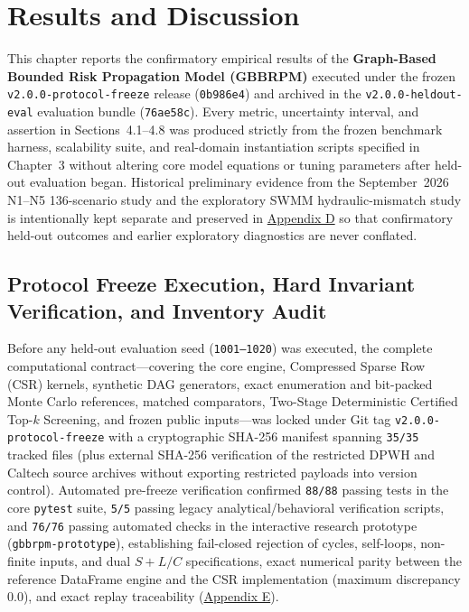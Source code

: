 \section{Results and Discussion}\label{results-and-discussion}

This chapter reports the confirmatory empirical results of the
\textbf{Graph-Based Bounded Risk Propagation Model (GBBRPM)} executed
under the frozen \texttt{v2.0.0-protocol-freeze} release
(\texttt{0b986e4}) and archived in the \texttt{v2.0.0-heldout-eval}
evaluation bundle (\texttt{76ae58c}). Every metric, uncertainty
interval, and assertion in Sections~4.1--4.8 was produced strictly from
the frozen benchmark harness, scalability suite, and real-domain
instantiation scripts specified in Chapter~3 without altering core
model equations or tuning parameters after held-out evaluation began.
Historical preliminary evidence from the September~2026 N1--N5
136-scenario study and the exploratory SWMM hydraulic-mismatch study is
intentionally kept separate and preserved in
\hyperref[app:preliminary]{Appendix D} so that confirmatory held-out
outcomes and earlier exploratory diagnostics are never conflated.

\subsection{Protocol Freeze Execution, Hard Invariant Verification, and Inventory Audit}
\label{sec:v2-protocol-audit}

Before any held-out evaluation seed (\texttt{1001--1020}) was executed,
the complete computational contract---covering the core engine,
Compressed Sparse Row (CSR) kernels, synthetic DAG generators, exact
enumeration and bit-packed Monte Carlo references, matched comparators,
Two-Stage Deterministic Certified Top-$k$ Screening, and frozen public
inputs---was locked under Git tag \texttt{v2.0.0-protocol-freeze} with
a cryptographic SHA-256 manifest spanning \texttt{35/35} tracked files
(plus external SHA-256 verification of the restricted DPWH and Caltech
source archives without exporting restricted payloads into version
control). Automated pre-freeze verification confirmed \texttt{88/88}
passing tests in the core \texttt{pytest} suite, \texttt{5/5} passing
legacy analytical/behavioral verification scripts, and \texttt{76/76}
passing automated checks in the interactive research prototype
(\texttt{gbbrpm-prototype}), establishing fail-closed rejection of
cycles, self-loops, non-finite inputs, and dual $S+L/C$ specifications,
exact numerical parity between the reference DataFrame engine and the
CSR implementation (maximum discrepancy $0.0$), and exact replay
traceability (\hyperref[app:prototype-contract]{Appendix E}).

